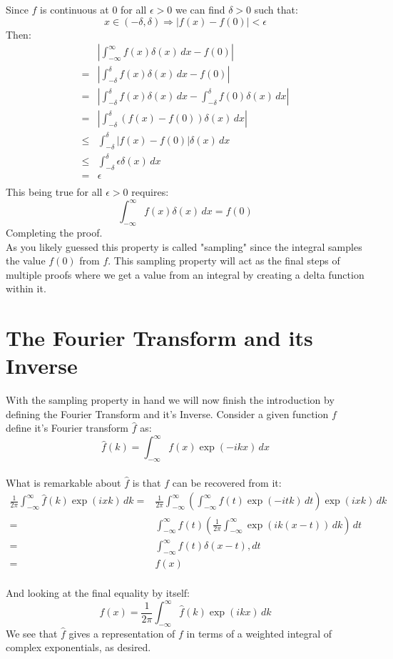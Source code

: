 Since $f$ is continuous at $0$ for all $\epsilon > 0$ we can find $\delta > 0$ such that:
\[x \in (-\delta,\delta) \Rightarrow |f(x)-f(0)| < \epsilon\]
Then:
\begin{equation*}
\begin{aligned}
	&\left|\int_{-\infty}^{\infty}f(x)\delta(x)\,dx-f(0)\right| \\
	=&\left|\int_{-\delta}^{\delta}f(x)\delta(x)\,dx-f(0)\right| \\
	=&\left|\int_{-\delta}^{\delta}f(x)\delta(x)\,dx-\int_{-\delta}^{\delta}f(0)\delta(x)\,dx\right| \\
	=&\left|\int_{-\delta}^{\delta}(f(x)-f(0))\delta(x)\,dx\right| \\
	\leq&\int_{-\delta}^{\delta}|f(x)-f(0)|\delta(x)\,dx \\
	\leq&\int_{-\delta}^{\delta}\epsilon\delta(x)\,dx \\
	=&\epsilon \\
\end{aligned}
\end{equation*}
This being true for all $\epsilon>0$ requires:
	\[\int_{-\infty}^{\infty}f(x)\delta(x)\,dx = f(0)\]
Completing the proof.
\\

As you likely guessed this property is called "sampling" since the integral samples the value $f(0)$ from $f$.
This sampling property will act as the final steps of multiple proofs where we get a value from an integral by creating a delta function within it.

\section{The Fourier Transform and its Inverse}
With the sampling property in hand we will now finish the introduction by defining the Fourier Transform and it's Inverse.
Consider a given function $f$ define it's Fourier transform $\hat{f}$ as:
\[\hat{f}(k) = \int_{-\infty}^{\infty}f(x)\exp(-ikx)\,dx\]
\\

What is remarkable about $\hat{f}$ is that $f$ can be recovered from it:
\label{sec:inv-trans}
\begin{equation*}
\begin{aligned}
	\frac{1}{2\pi}\int_{-\infty}^{\infty}\hat{f}(k)\exp(ixk)\,dk 
	=& \frac{1}{2\pi}\int_{-\infty}^{\infty}\left(\int_{-\infty}^{\infty}f(t)\exp(-itk)\,dt\right)\exp(ixk)\,dk \\
	=& \int_{-\infty}^{\infty}f(t)\left(\frac{1}{2\pi}\int_{-\infty}^{\infty}\exp(ik(x-t))\,dk\right)\,dt \\
	=& \int_{-\infty}^{\infty}f(t)\delta(x-t),dt \\
	=& f(x) \\
\end{aligned}
\end{equation*}

And looking at the final equality by itself:
\[f(x) = \frac{1}{2\pi}\int_{-\infty}^{\infty}\hat{f}(k)\exp(ikx)\,dk\]
We see that $\hat{f}$ gives a representation of $f$ in terms of a weighted integral of complex exponentials, as desired.

